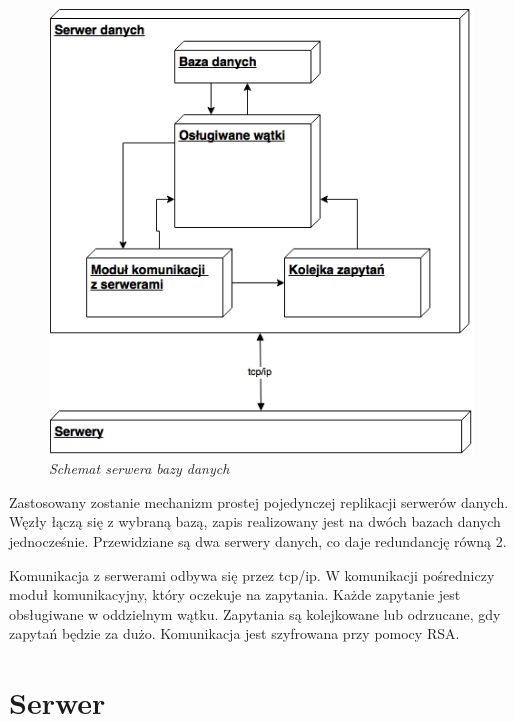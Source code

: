 \begin{figure}[!h]
    \begin{center}
    \includegraphics[angle=0,scale=0.75]{img/db.png}
    \end{center}
    \caption{\em Schemat serwera bazy danych}
    \label{fig:db}
\end{figure}

Zastosowany zostanie mechanizm prostej pojedynczej replikacji serwerów danych. Węzły łączą się z wybraną bazą, zapis realizowany jest na dwóch bazach danych jednocześnie.
Przewidziane są dwa serwery danych, co daje redundancję równą 2.

Komunikacja z serwerami odbywa się przez tcp/ip. W komunikacji pośredniczy moduł komunikacyjny, który oczekuje na zapytania. Każde zapytanie jest obsługiwane w oddzielnym wątku. Zapytania są kolejkowane lub odrzucane, gdy zapytań będzie za dużo. Komunikacja jest szyfrowana przy pomocy RSA.


\section{Serwer}

